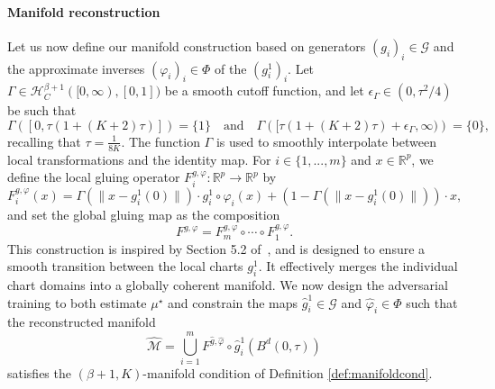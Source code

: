 \documentclass[10pt]{article}
\begin{document}
\paragraph{Manifold reconstruction}
Let us now define our manifold construction based on generators $(g_i)_i\in \mathcal{G}$ and the approximate inverses $(\varphi_i)_i\in \Phi$ of the $(g_i^1)_i$. Let \( \Gamma \in \mathcal{H}^{\beta+1}_{C}([0,\infty), [0,1]) \) be a smooth cutoff function, and let \( \epsilon_\Gamma \in (0, \tau^2/4) \) be such that
\begin{equation}\label{eq:Gamma}
\Gamma\left([0, \tau(1 + (K + 2)\tau)]\right) = \{1\} \quad \text{and} \quad \Gamma\left([\tau(1 + (K + 2)\tau) + \epsilon_\Gamma, \infty)\right) = \{0\},
\end{equation}
recalling that $\tau=\frac{1}{8K}$.
The function $\Gamma$ is used to smoothly interpolate between local transformations and the identity map. For $i\in \{1,...,m\}$ and $x\in \mathbb{R}^p$, we define the local gluing operator \( F_i^{g,\varphi}: \mathbb{R}^p \rightarrow \mathbb{R}^p \) by
\begin{equation}\label{eq:Fi}
    F_i^{g,\varphi}(x) = \Gamma\left(\|x - g_i^1(0)\|\right) \cdot g_i^1 \circ \varphi_i(x) + \left(1 - \Gamma\left(\|x - g_i^1(0)\|\right)\right) \cdot x,
\end{equation}
and set the global gluing map as the composition
\begin{equation}\label{eq:Ffinal}
F^{g,\varphi} = F_m^{g,\varphi} \circ \cdots \circ F_1^{g,\varphi}.
\end{equation}
This construction is inspired by Section 5.2 of~\cite{fefferman2015reconstruction}, and is designed to ensure a smooth transition between the local charts \( g_i^1 \). It effectively merges the individual chart domains into a globally coherent manifold. We now design the adversarial training to both estimate $\mu^\star$ and constrain the maps \( \hat{g}_i^1 \in \mathcal{G} \) and \( \hat{\varphi}_i \in \Phi \) such that the reconstructed manifold
\[
\hat{\mathcal{M}} = \bigcup_{i=1}^m F^{\hat{g}, \hat{\varphi}} \circ \hat{g}_i^1\left(B^d(0, \tau)\right)
\]
satisfies the \( (\beta+1, K) \)-manifold condition of Definition \ref{def:manifoldcond}.
\end{document}
